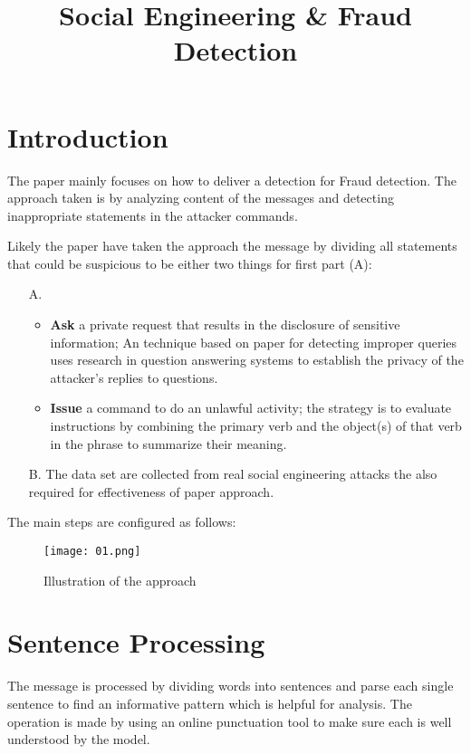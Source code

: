 \documentclass[margin=.4in]{paper}
\title{Social Engineering \& Fraud Detection}
\begin{document}
	\maketitle
	
	\section{Introduction}
	
	The paper mainly focuses on how to deliver a detection for Fraud detection. The approach taken is by analyzing content of the messages and detecting inappropriate statements in the attacker commands.
	
	Likely the paper have taken the approach the message by dividing all statements that could be suspicious to be either two things for first part (A):
	
	\begin{enumerate}
		\item[A. ] \begin{itemize}
			\item \textbf{Ask} a private request that results in the disclosure of sensitive information; An technique based on paper for detecting improper queries uses research in question answering systems to establish the privacy of the attacker's replies to questions.
			\item \textbf{Issue} a command to do an unlawful activity; the strategy is to evaluate instructions by combining the primary verb and the object(s) of that verb in the phrase to summarize their meaning.
		\end{itemize}
	
		\item[B. ] The data set are collected from real social engineering attacks the also required for effectiveness of paper approach.
	\end{enumerate}

	The main steps are configured as follows:
	
	\begin{figure}[htbp]
		\texttt{[image: 01.png]}
		\caption{Illustration of the approach}
	\end{figure}


	\clearpage
	
	\section{Sentence Processing}
	The message is processed by dividing words into sentences and parse each single sentence to find an informative pattern which is helpful for analysis. The operation is made by using an online punctuation tool to make sure each is well understood by the model.
	
\end{document}
